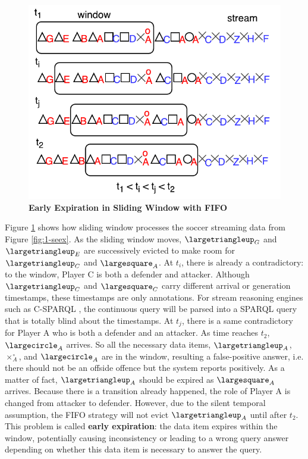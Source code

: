 \begin{figure}[!htbp]
	\centering
	\includegraphics[width=5in]{img/1-seexw.pdf}
	\caption{\textbf{Early Expiration in Sliding Window with FIFO}}
	\label{fig:1-seexw} 
\end{figure}

Figure \ref{fig:1-seexw} shows how sliding window processes the soccer streaming data from Figure \ref{fig:1-seex}. 
As the sliding window moves, $\largetriangleup_{G}$ and $\largetriangleup_{E}$ are successively evicted to make room for $\largetriangleup_{C}$ and $\largesquare_{A}$.
At $t_{i}$, there is already a contradictory: to the window, Player C is both a defender and attacker. 
Although $\largetriangleup_{C}$ and $\largesquare_{C}$ carry different arrival or generation timestamps, these timestamps are only annotations.
For stream reasoning engines such as C-SPARQL \cite{barbieri2010execution}, the continuous query will be parsed into a SPARQL query that is totally blind about the timestamps. 
At $t_{j}$, there is a same contradictory for Player A who is both a defender and an attacker. 
As time reaches $t_{2}$, $\largecircle_{A}$ arrives. 
So all the necessary data items, $\largetriangleup_{A}$, $\times^{\circ}_{A}$, and $\largecircle_{A}$ are in the window, resulting a false-positive answer, i.e. there should not be an offside offence but the system reports positively. 
As a matter of fact, $\largetriangleup_{A}$ should be expired as $\largesquare_{A}$ arrives.
Because there is a transition already happened, the role of Player A is changed from attacker to defender. 
However, due to the silent temporal assumption, the FIFO strategy will not evict $\largetriangleup_{A}$ until after $t_{2}$.
This problem is called \textbf{early expiration}: the data item expires within the window, potentially causing inconsistency or leading to a wrong query answer depending on whether this data item is necessary to answer the query. 
%
